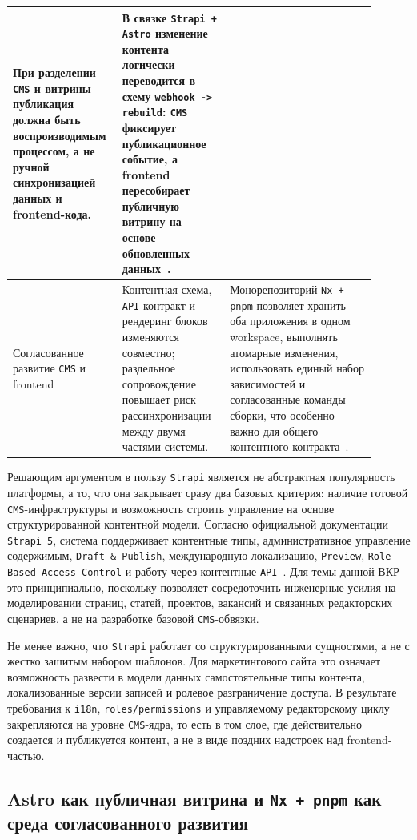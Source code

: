 \begin{longtable}{@{}L{0.24\linewidth}L{0.28\linewidth}L{0.38\linewidth}@{}}
  При разделении \texttt{CMS} и витрины публикация должна быть воспроизводимым процессом,
  а не ручной синхронизацией данных и frontend-кода. &
  В связке \texttt{Strapi + Astro} изменение контента логически переводится в схему
  \texttt{webhook -> rebuild}: \texttt{CMS} фиксирует публикационное событие, а frontend
  пересобирает публичную витрину на основе обновленных данных~\cite{astro-strapi-guide}. \\
  \midrule
  Согласованное развитие \texttt{CMS} и frontend &
  Контентная схема, \texttt{API}-контракт и рендеринг блоков изменяются совместно;
  раздельное сопровождение повышает риск рассинхронизации между двумя частями системы. &
  Монорепозиторий \texttt{Nx + pnpm} позволяет хранить оба приложения в одном workspace,
  выполнять атомарные изменения, использовать единый набор зависимостей и согласованные
  команды сборки, что особенно важно для общего контентного контракта~\cite{nx-monorepos}. \\
\end{longtable}
\endgroup

Решающим аргументом в пользу \texttt{Strapi} является не абстрактная популярность
платформы, а то, что она закрывает сразу два базовых критерия: наличие готовой
\texttt{CMS}-инфраструктуры и возможность строить управление на основе структурированной
контентной модели. Согласно официальной документации \texttt{Strapi 5}, система
поддерживает контентные типы, административное управление содержимым,
\texttt{Draft \& Publish}, международную локализацию, \texttt{Preview},
\texttt{Role-Based Access Control} и работу через контентные \texttt{API}~\cite{strapi-cms-docs}.
Для темы данной ВКР это принципиально, поскольку позволяет сосредоточить инженерные
усилия на моделировании страниц, статей, проектов, вакансий и связанных редакторских
сценариев, а не на разработке базовой \texttt{CMS}-обвязки.

Не менее важно, что \texttt{Strapi} работает со структурированными сущностями, а не с
жестко зашитым набором шаблонов. Для маркетингового сайта это означает возможность
развести в модели данных самостоятельные типы контента, локализованные версии записей и
ролевое разграничение доступа. В результате требования к \texttt{i18n},
\texttt{roles/permissions} и управляемому редакторскому циклу закрепляются на уровне
\texttt{CMS}-ядра, то есть в том слое, где действительно создается и публикуется
контент, а не в виде поздних надстроек над frontend-частью.

\subsection{Astro как публичная витрина и \texttt{Nx + pnpm} как среда согласованного развития}

